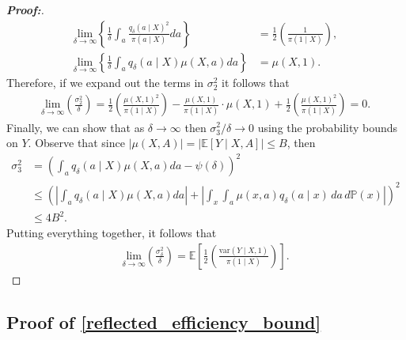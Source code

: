 \documentclass[11pt,twoside]{article}
\newcommand{\var}{\text{var}}
\theoremstyle{definition}
\theoremstyle{remark}
\begin{document}
\begin{proof}[\textbf{Proof:}]
\begin{align*}
     \underset{\delta \to \infty}{\text{lim}}\left\{\frac{1}{\delta}\int_a \frac{q_\delta(a\mid X)^2}{\pi(a\mid X)}da \right\} &= \frac{1}{2} \left( \frac{1}{\pi(1\mid X)} \right), \\
     \underset{\delta \to \infty}{\text{lim}}\left\{\frac{1}{\delta}\int_a q_\delta(a\mid X) \mu(X, a) da \right\} &= \mu(X, 1).
\end{align*}
Therefore, if we expand out the terms in $\sigma^2_2$ it follows that
\begin{align*}
    \underset{\delta \to \infty}{\text{lim}}\left( \frac{\sigma_2^2}{\delta}\right) = \frac{1}{2}\left(\frac{\mu(X,1)^2}{\pi(1\mid X)} \right) - \frac{\mu(X,1)}{\pi(1\mid X)}\cdot \mu(X,1)  + \frac{1}{2}\left( \frac{\mu(X,1)^2}{\pi(1\mid X)}\right) = 0.
\end{align*}
Finally, we can show that as $\delta \to \infty$ then $\sigma_3^2 / \delta \to 0$ using the probability bounds on $Y$. Observe that since $| \mu(X, A)| = |\mathbb{E}[Y \mid X, A]|  \leq B$, then
\begin{align*}
    \sigma^2_3 &=  \left(\int_a q_\delta(a \mid X) \mu(X, a)da  - \psi(\delta) \right)^2 \\
    &\leq \left(\left|\int_a q_\delta(a \mid X) \mu(X, a)da \right| + \left|\int_x \int_a \mu(x, a) q_\delta(a \mid x) \, da \, d\mathbb{P}(x) \right| \right)^2 \\
    &\leq 4B^2.
\end{align*}
Putting everything together, it follows that
\begin{align*}
     \underset{\delta \to \infty}{\text{lim}}\left( \frac{\sigma^2_\delta }{\delta}\right) = \mathbb{E} \left[\frac{1}{2} \left( \frac{\var(Y \mid X,1)}{\pi(1 \mid X)} \right) \right].
\end{align*}
\end{proof}


\subsection{Proof of \cref{reflected_efficiency_bound}} \label{reflected_efficiency_bound_proof}
\end{document}
